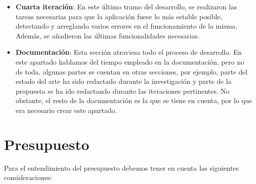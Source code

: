 \begin{itemize}
	\item \textbf{Cuarta iteración}: En este último tramo del desarrollo, se realizaron las tareas necesarias para que la aplicación fuese lo más estable posible, detectando y arreglando varios errores en el funcionamiento de la misma. Además, se añadieron las últimas funcionalidades necesarias.
	
	\item \textbf{Documentación}: Esta sección atraviesa todo el proceso de desarrollo. En este apartado hablamos del tiempo empleado en la documentación, pero no de toda, algunas partes se cuentan en otras secciones, por ejemplo, parte del estado del arte ha sido redactado durante la investigación y parte de la propuesta se ha ido redactando durante las iteraciones pertinentes. No obstante, el resto de la documentación es la que se tiene en cuenta, por lo que era necesario crear este apartado.
\end{itemize}

\section{Presupuesto}

Para el entendimiento del presupuesto debemos tener en cuenta las siguientes consideraciones:

